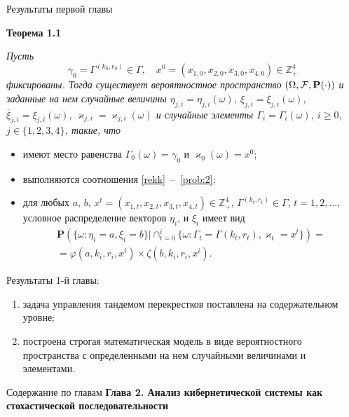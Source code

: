 \documentclass[10pt]{beamer}
\begin{document}
\begin{frame}[allowframebreaks]{Результаты первой главы}

    {\bf Теорема 1.1} {\it 
    Пусть 
    $$\gamma_0=\Gamma^{(k_0,r_0)} \in \Gamma, \quad x^0=(x_{1,0},x_{2,0}, x_{3,0},x_{4,0})\in \mathbb{Z}_+^4$$ фиксированы. Тогда существует вероятностное пространство $(\Omega, {\cal F}, {\mathbf P}(\cdot))$ и заданные на нем случайные величины $\eta_{j,i}=\eta_{j,i}(\omega)$, $\xi_{j,i}=\xi_{j,i}(\omega)$, $\overline{\xi}_{j,i}=\xi_{j,i}(\omega)$, $\varkappa_{j,i}=\varkappa_{j,i}(\omega)$ и случайные элементы $\Gamma_i=\Gamma_i(\omega)$, $i\geqslant 0$, $j\in \{1, 2, 3, 4\}$, такие, что 
    \begin{itemize}
    \item имеют место равенства $\Gamma_0(\omega) = \gamma_0$ и $\varkappa_0(\omega)=x^0$;
    \item выполняются соотношения \eqref{rekk}~-- \,\eqref{prob:2};
    \item для любых  $a$, $b$, $x^t=(x_{1,t},x_{2,t},x_{3,t},x_{4,t}) \in \mathbb{Z}_+^4$, $\Gamma^{(k_t,r_t)} \in \Gamma$, $t = 1, 2, \ldots$, условное распределение векторов $\eta_i$, и $\xi_i$ имеет вид 
\begin{multline*}
    {\mathbf P}(\{ \omega \colon \eta_i = a, \xi_i=b\} |\cap_{t=0}^{i}\{\omega\colon \Gamma_t=\Gamma{(k_t,r_t)}, \varkappa_t=x^t\})=\\
=\varphi(a,k_i,r_i,x^i)\times \zeta(b,k_i,r_i,x^i).
\end{multline*}
    \end{itemize}
}

\framebreak

Результаты 1-й главы:
\begin{enumerate}
    \item задача управления тандемом перекрестков поставлена на содержательном уровне;
    \item построена строгая математическая модель в виде вероятностного пространства с определенными на нем случайными величинами и элементами.

\end{enumerate}


\end{frame}



  \begin{frame}{Содержание по главам}
  \Large{\textbf{Глава 2. Анализ кибернетической системы как стохастической последовательности}}\par


      \end{frame}
\end{document}
